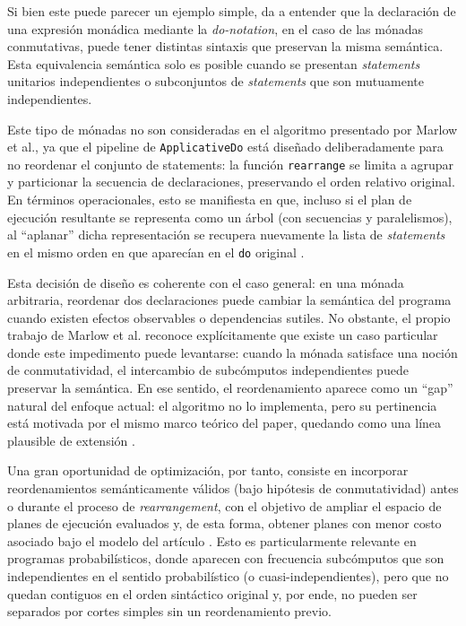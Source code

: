 Si bien este puede parecer un ejemplo simple, da a entender que la declaración de una expresión monádica mediante la \textit{do-notation}, en el caso de las mónadas conmutativas, puede tener distintas sintaxis que preservan la misma semántica. Esta equivalencia semántica solo es posible cuando se presentan \textit{statements} unitarios independientes o subconjuntos de \textit{statements} que son mutuamente independientes.

Este tipo de mónadas no son consideradas en el algoritmo presentado por Marlow et al., ya que el pipeline de \texttt{ApplicativeDo} está diseñado deliberadamente para no reordenar el conjunto de statements: la función \texttt{rearrange} se limita a agrupar y particionar la secuencia de declaraciones, preservando el orden relativo original. En términos operacionales, esto se manifiesta en que, incluso si el plan de ejecución resultante se representa como un árbol (con secuencias y paralelismos), al ``aplanar'' dicha representación se recupera nuevamente la lista de \textit{statements} en el mismo orden en que aparecían en el \texttt{do} original \cite[p.~95]{MarlowPJKM2016}.

Esta decisión de diseño es coherente con el caso general: en una mónada arbitraria, reordenar dos declaraciones puede cambiar la semántica del programa cuando existen efectos observables o dependencias sutiles. No obstante, el propio trabajo de Marlow et al. reconoce explícitamente que existe un caso particular donde este impedimento puede levantarse: cuando la mónada satisface una noción de conmutatividad, el intercambio de subcómputos independientes puede preservar la semántica. En ese sentido, el reordenamiento aparece como un ``gap'' natural del enfoque actual: el algoritmo no lo implementa, pero su pertinencia está motivada por el mismo marco teórico del paper, quedando como una línea plausible de extensión \cite[p.~94]{MarlowPJKM2016}.

Una gran oportunidad de optimización, por tanto, consiste en incorporar reordenamientos semánticamente válidos (bajo hipótesis de conmutatividad) antes o durante el proceso de \textit{rearrangement}, con el objetivo de ampliar el espacio de planes de ejecución evaluados y, de esta forma, obtener planes con menor costo asociado bajo el modelo del artículo \cite{MarlowPJKM2016}. Esto es particularmente relevante en programas probabilísticos, donde aparecen con frecuencia subcómputos que son independientes en el sentido probabilístico (o cuasi-independientes), pero que no quedan contiguos en el orden sintáctico original y, por ende, no pueden ser separados por cortes simples sin un reordenamiento previo.

